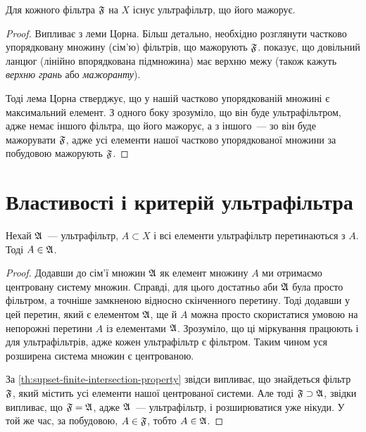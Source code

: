 \begin{theorem}
    \label{th:every-filter-has-supset-ultrafilter}
    Для кожного фільтра $\frak F$ на $X$ існує ультрафільтр, що його мажорує.
\end{theorem}
\begin{proof}
    Випливає з леми Цорна. Більш детально, необхідно розглянути частково упорядковану множину (сім'ю) фільтрів, що мажорують $\frak F$.  показує, що довільний ланцюг (лінійно впорядкована підмножина) має верхню межу (також кажуть \emph{верхню грань} або \emph{мажоранту}). \medskip
    
    Тоді лема Цорна стверджує, що у нашій частково упорядкованій множині є максимальний елемент. З одного боку зрозуміло, що він буде ультрафільтром, адже немає іншого фільтра, що його мажорує, а з іншого~--- зо він буде мажорувати $\frak F$, адже усі елементи нашої частково упорядкованої множини за побудовою мажорують $\frak F$.
\end{proof}

\section{Властивості і критерій ультрафільтра}

\begin{lemma}
    \label{lem:ultrafilter-absorbs-intersections}
    Нехай $\frak A$~--- ультрафільтр, $A \subset X$ і всі елементи ультрафільтр перетинаються з $A$. Тоді $A \in \frak A$.
\end{lemma}
\begin{proof}
    Додавши до сім'ї множин $\frak A$ як елемент множину $A$ ми отримаємо центровану систему множин. Справді, для цього достатньо аби $\frak A$ була просто фільтром, а точніше замкненою відносно скінченного перетину. Тоді додавши у цей перетин, який є елементом $\frak A$, ще й $A$ можна просто скористатися умовою на непорожні перетини $A$ із елементами $\frak A$. Зрозуміло, що ці міркування працюють і для ультрафільтрів, адже кожен ультрафільтр є фільтром. Таким чином уся розширена система множин є центрованою. \medskip
    
    За \cref{th:supset-finite-intersection-property} звідси випливає, що знайдеться фільтр $\frak F$, який містить усі елементи нашої центрованої системи. Але тоді $\frak F \supset \frak A$, звідки випливає, що $\frak F = \frak A$, адже $\frak A$~--- ультрафільтр, і розширюватися уже нікуди. У той же час, за побудовою, $A \in \frak F$, тобто $A \in \frak A$.
\end{proof}

